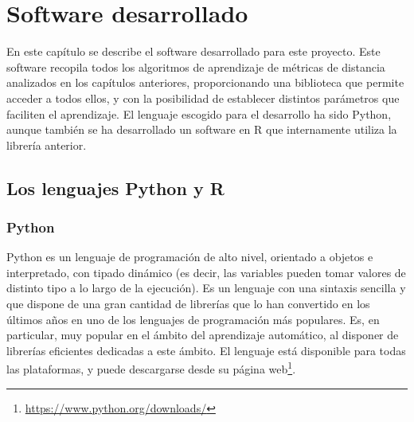 \chapter{Software desarrollado} \label{chapter:software}

En este capítulo se describe el software desarrollado para este proyecto. Este software recopila todos los algoritmos de aprendizaje de métricas de distancia analizados en los capítulos anteriores, proporcionando una biblioteca que permite acceder a todos ellos, y con la posibilidad de establecer distintos parámetros que faciliten el aprendizaje. El lenguaje escogido para el desarrollo ha sido Python, aunque también se ha desarrollado un software en R que internamente utiliza la librería anterior.

\section{Los lenguajes Python y R}

\subsection{Python}

Python \cite{python} es un lenguaje de programación de alto nivel, orientado a objetos e interpretado, con tipado dinámico (es decir, las variables pueden tomar valores de distinto tipo a lo largo de la ejecución). Es un lenguaje con una sintaxis sencilla y que dispone de una gran cantidad de librerías que lo han convertido en los últimos años en uno de los lenguajes de programación más populares. Es, en particular, muy popular en el ámbito del aprendizaje automático, al disponer de librerías eficientes dedicadas a este ámbito. El lenguaje está disponible para todas las plataformas, y puede descargarse desde su página web\footnote{\url{https://www.python.org/downloads/}}.

